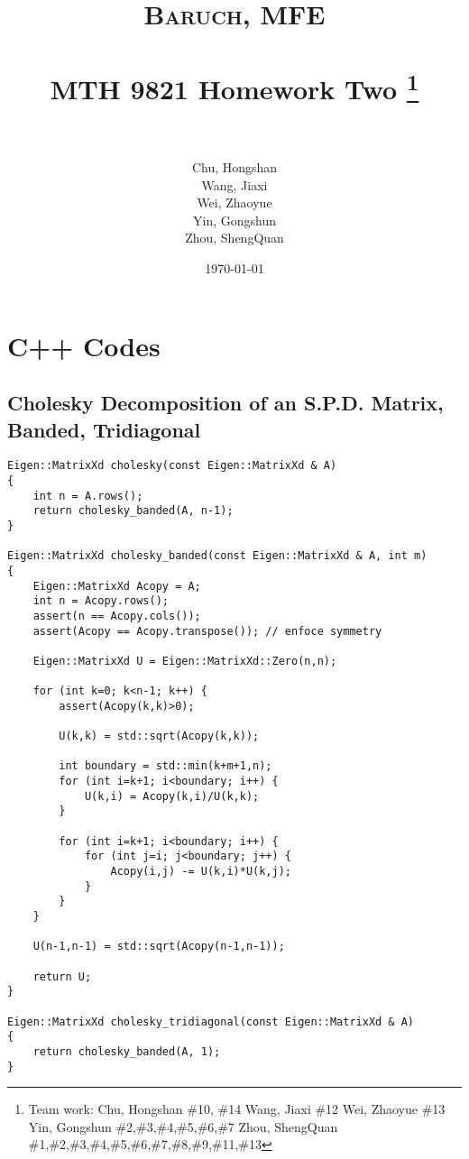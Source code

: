 \documentclass[paper=a4, fontsize=11pt]{scrartcl} %
\title{	
\normalfont \normalsize
\textsc{Baruch, MFE} \\ [25pt] %
\horrule{0.5pt} \\[0.4cm] %
\huge MTH 9821 Homework Two \footnote{Team work:\newline
Chu, Hongshan \#10, \#14\newline 
Wang, Jiaxi \#12\newline
Wei, Zhaoyue \#13\newline 
Yin, Gongshun \#2,\#3,\#4,\#5,\#6,\#7 \newline
Zhou, ShengQuan \#1,\#2,\#3,\#4,\#5,\#6,\#7,\#8,\#9,\#11,\#13}\\  %
\horrule{2pt} \\[0.5cm] %
}
\author{Chu, Hongshan\\
Wang, Jiaxi\\
Wei, Zhaoyue\\
Yin, Gongshun\\
Zhou, ShengQuan} %
\date{\normalsize\today} %
\numberwithin{equation}{section} %
\numberwithin{figure}{section} %
\numberwithin{table}{section} %
\begin{document}
	


\maketitle %

\newpage



\section{C++ Codes}
\subsection{Cholesky Decomposition of an S.P.D. Matrix, Banded, Tridiagonal}
\begin{lstlisting}
Eigen::MatrixXd cholesky(const Eigen::MatrixXd & A)
{
    int n = A.rows();
    return cholesky_banded(A, n-1); 
}

Eigen::MatrixXd cholesky_banded(const Eigen::MatrixXd & A, int m)
{
    Eigen::MatrixXd Acopy = A;
    int n = Acopy.rows();
    assert(n == Acopy.cols());
    assert(Acopy == Acopy.transpose()); // enfoce symmetry

    Eigen::MatrixXd U = Eigen::MatrixXd::Zero(n,n);

    for (int k=0; k<n-1; k++) {
        assert(Acopy(k,k)>0);

        U(k,k) = std::sqrt(Acopy(k,k));

        int boundary = std::min(k+m+1,n);
        for (int i=k+1; i<boundary; i++) {
            U(k,i) = Acopy(k,i)/U(k,k);
        }

        for (int i=k+1; i<boundary; i++) {
            for (int j=i; j<boundary; j++) {
                Acopy(i,j) -= U(k,i)*U(k,j);
            }
        }
    }

    U(n-1,n-1) = std::sqrt(Acopy(n-1,n-1));

    return U; 
}

Eigen::MatrixXd cholesky_tridiagonal(const Eigen::MatrixXd & A)
{
    return cholesky_banded(A, 1);
}
\end{lstlisting}
\newpage
\end{document}
